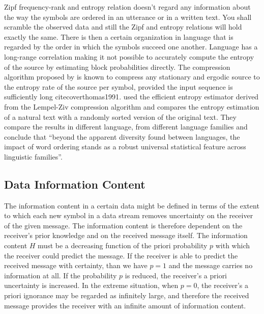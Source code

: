 Zipf frequency-rank and entropy relation doesn't regard any information about the way the symbols
are ordered in an utterance or in a written text. You shall scramble the observed data
and still the Zipf and entropy relations will hold exactly the same.
There is then a certain organization in language that is regarded by the order in
which the symbols succeed one another. 
Language has a long-range correlation making it not possible to accurately compute 
the entropy of the source by estimating block probabilities directly.
The compression algorithm proposed by \cite{lempelziv1978} is known to compress
any stationary and ergodic source to the entropy rate of the source per symbol,
provided the input sequence is sufficiently long cite{coverthomas1991}.
\cite{montemurro2011} used the efficient entropy
estimator derived from the Lempel-Ziv compression algorithm
and compares the entropy estimation of a natural text with a randomly sorted version 
of the original text. They compare the results in different language, from
different language families and conclude that ``beyond the apparent
diversity found between languages, the impact of word ordering
stands as a robust universal statistical feature across linguistic
families''\citep{montemurro2011}.





\subsection{Data Information Content}
The information content in a certain data might be defined in terms of the extent
to which each new symbol in a data stream removes uncertainty on the receiver of
the given message. The information content is therefore dependent on the receiver's
prior knowledge and on the received message itself. The information content $H$ 
must be a decreasing function of the priori probability $p$ with which the receiver 
could predict the message. If the receiver is able to predict the received message
with certainty, than we have $p=1$ and the message carries no information at all.
If the probability $p$ is reduced, the receiver's a priori uncertainty is increased.
In the extreme situation, when $p=0$, the receiver's a priori ignorance may be regarded
as infinitely large, and therefore the received message provides the receiver with
an infinite amount of information content. 

